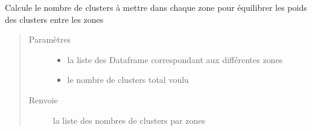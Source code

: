 \documentclass[letterpaper,10pt,french]{sphinxmanual}
\begin{document}
\begin{fulllineitems}
\label{\detokenize{index:src.clusterizer.clusterizer.calcule_nb_clusters_par_zone}}
\sphinxAtStartPar
Calcule le nombre de clusters à mettre dans chaque zone pour équilibrer les poids des clusters entre les zones
\begin{quote}\begin{description}
\item[{Paramètres}] \leavevmode\begin{itemize}
\item {} 
\sphinxAtStartPar
{} \textendash{} la liste des Dataframe correspondant aux différentes zones

\item {} 
\sphinxAtStartPar
{} \textendash{} le nombre de clusters total voulu

\end{itemize}

\item[{Renvoie}] \leavevmode
\sphinxAtStartPar
la liste des nombres de clusters par zones

\end{description}\end{quote}

\end{fulllineitems}

\end{document}
